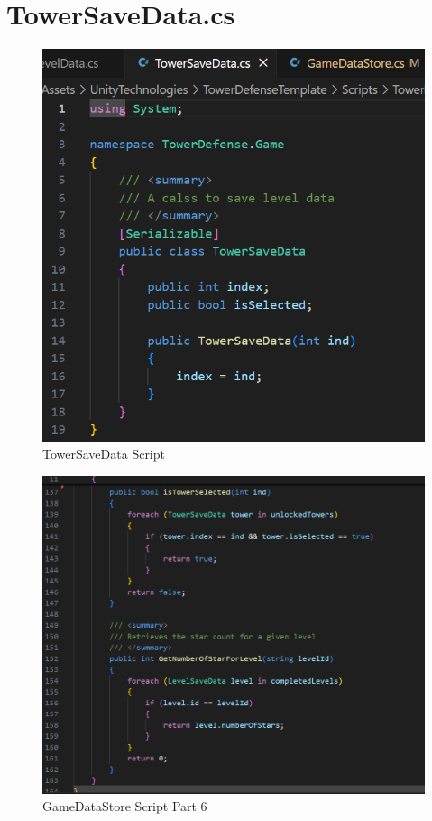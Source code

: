 \documentclass[12pt,a4paper]{report}
\begin{document}
\section{TowerSaveData.cs}
\begin{figure}[h!]
	\centering
	\includegraphics[scale=0.75]{images/TowerSaveData.png}
	\caption{TowerSaveData Script}
	\label{fig:TowerSaveData}
\end{figure}

\begin{figure}[h!]
	\centering
	\includegraphics[scale=0.75]{images/GameDataStore6.png}
	\caption{GameDataStore Script Part 6}
	\label{fig:GameDataStore6}
\end{figure}
\end{document}
